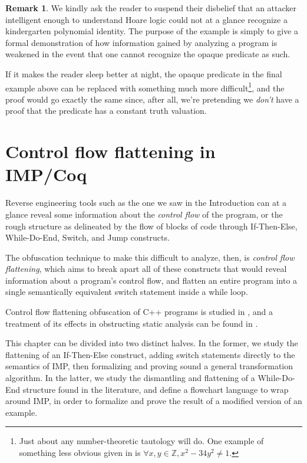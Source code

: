 \documentclass[12pt,notitlepage]{report}
\theoremstyle{plain}
\theoremstyle{definition}
\newtheorem{rem}[theo]{Remark}
\newcommand\Z{\mathbb{Z}}
\newcommand{\define}[1]{\emph{#1}\index{#1}}
\numberwithin{equation}{section}
\begin{document}
\begin{rem}
    We kindly ask the reader to suspend their disbelief that an attacker intelligent enough to understand Hoare logic could not at a glance recognize a kindergarten polynomial identity.  The purpose of the example is simply to give a formal demonstration of how information gained by analyzing a program is weakened in the event that one cannot recognize the opaque predicate as such.
    \par If it makes the reader sleep better at night, the opaque predicate in the final example above can be replaced with something much more difficult\footnote{Just about any number-theoretic tautology will do.  One example of something less obvious given in \cite{CoNa} is $\forall x, y \in \Z, x^2 - 34y^2 \neq 1$.}, and the proof would go exactly the same since, after all, we're pretending we \emph{don't} have a proof that the predicate has a constant truth valuation.
\end{rem}

\chapter{Control flow flattening in IMP/Coq}\label{Ch4}
Reverse engineering tools such as the one we saw in the Introduction can at a glance reveal some information about the \define{control flow} of the program, or the rough structure as delineated by the flow of blocks of code through If-Then-Else, While-Do-End, Switch, and Jump constructs.

\par The obfuscation technique to make this difficult to analyze, then, is \define{control flow flattening}, which aims to break apart all of these constructs that would reveal information about a program's control flow, and flatten an entire program into a single semantically equivalent switch statement inside a while loop.

\par Control flow flattening obfuscation of C++ programs is studied in \cite{Laszlo}, and a treatment of its effects in obstructing static analysis can be found in \cite{Wang}.  

\par This chapter can be divided into two distinct halves.  In the former, we study the flattening of an If-Then-Else construct, adding switch statements directly to the semantics of IMP, then formalizing and proving sound a general transformation algorithm.  In the latter, we study the dismantling and flattening of a While-Do-End structure found in the literature, and define a flowchart language to wrap around IMP, in order to formalize and prove the result of a modified version of an example.
\end{document}
